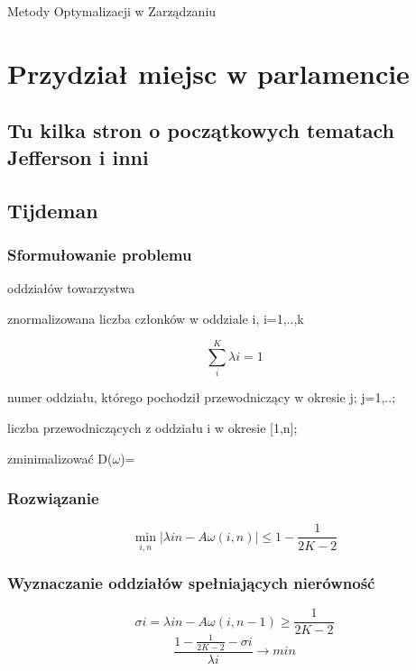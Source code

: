 \documentclass[12pt,a4paper]{article}
\begin{document}
\lstset{language=Pascal}
Metody Optymalizacji w Zarządzaniu
\newpage
\tableofcontents
\section{Przydział miejsc w parlamencie}
\subsection{Tu kilka stron o początkowych tematach Jefferson i inni}

\newpage
\subsection{Tijdeman}
\subsubsection{Sformułowanie problemu}
\begin{description}
\item[k] oddziałów towarzystwa
\item[$\lambda$i] znormalizowana liczba członków w oddziale i, i=1,..,k
\item \begin{equation}
\sum \limits_{i}^{K} \lambda i = 1
\end{equation}
\item[$\omega$i] numer oddziału, którego pochodził przewodniczący w okresie j; j=1,..;
\item[A$\omega$(i,n)] liczba przewodniczących z oddziału i w okresie [1,n]; 
\item zminimalizować D($\omega$)=
\end{description}

\subsubsection{Rozwiązanie}
\begin{equation}
\min\limits_{i,n}\left | \lambda in - A\omega(i,n)\right | \leq 1-\frac{1}{2K-2}
\end{equation}
\subsubsection{Wyznaczanie oddziałów spełniających nierówność}
\begin{equation}
\sigma i = \lambda in - A\omega (i,n-1) \geq \frac{1}{2K-2}
\end{equation}
\begin{equation}
\frac{1-\frac{1}{2K-2}-\sigma i}{\lambda i} \to min
\end{equation}
\end{document}
